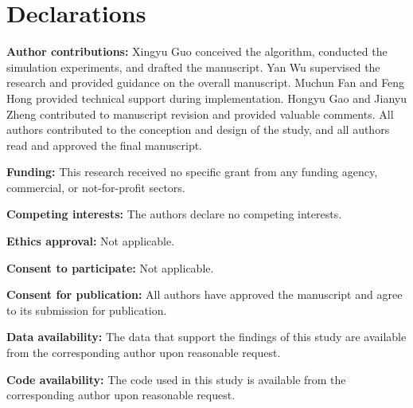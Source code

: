 \documentclass[sn-mathphys-num]{sn-jnl}%
\begin{document}
\section*{Declarations}

\textbf{Author contributions:} Xingyu Guo conceived the algorithm, conducted the simulation experiments, and drafted the manuscript. Yan Wu supervised the research and provided guidance on the overall manuscript. Muchun Fan and Feng Hong provided technical support during implementation. Hongyu Gao and Jianyu Zheng contributed to manuscript revision and provided valuable comments. All authors contributed to the conception and design of the study, and all authors read and approved the final manuscript.

\textbf{Funding:} This research received no specific grant from any funding agency, commercial, or not-for-profit sectors.

\textbf{Competing interests:} The authors declare no competing interests.

\textbf{Ethics approval:} Not applicable.

\textbf{Consent to participate:} Not applicable.

\textbf{Consent for publication:} All authors have approved the manuscript and agree to its submission for publication.

\textbf{Data availability:} The data that support the findings of this study are available from the corresponding author upon reasonable request.

\textbf{Code availability:} The code used in this study is available from the corresponding author upon reasonable request.




\end{document}

